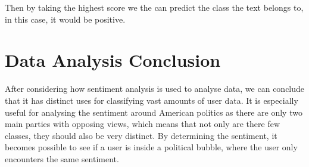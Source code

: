 Then by taking the highest score we the can predict the class the text belongs
to, in this case, it would be positive.

\section{Data Analysis Conclusion}\label{sec:DAConc}
After considering how sentiment analysis is used to analyse data, we can
conclude that it has distinct uses for classifying vast amounts of user data. It
is especially useful for analysing the sentiment around American politics as
there are only two main parties with opposing views, which means that not only
are there few classes, they should also be very distinct. By determining the
sentiment, it becomes possible to see if a user is inside a political bubble,
where the user only encounters the same sentiment.



